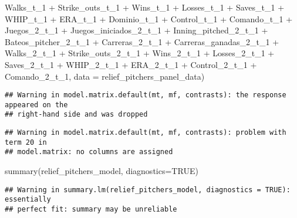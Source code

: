 \documentclass[
]{article}
\newenvironment{Shaded}{\begin{snugshade}}{\end{snugshade}}
\newcommand{\AttributeTok}[1]{\textcolor[rgb]{0.77,0.63,0.00}{#1}}
\newcommand{\ConstantTok}[1]{\textcolor[rgb]{0.00,0.00,0.00}{#1}}
\newcommand{\FunctionTok}[1]{\textcolor[rgb]{0.00,0.00,0.00}{#1}}
\newcommand{\NormalTok}[1]{#1}
\newcommand{\SpecialCharTok}[1]{\textcolor[rgb]{0.00,0.00,0.00}{#1}}
\begin{document}
\begin{Shaded}
\begin{Highlighting}[]
\NormalTok{Walks\_t\_1  }\SpecialCharTok{+}\NormalTok{ Strike\_outs\_t\_1 }\SpecialCharTok{+}\NormalTok{ Wins\_t\_1 }\SpecialCharTok{+}\NormalTok{  Losses\_t\_1 }\SpecialCharTok{+}\NormalTok{ Saves\_t\_1 }\SpecialCharTok{+}\NormalTok{ WHIP\_t\_1 }\SpecialCharTok{+}\NormalTok{ ERA\_t\_1 }\SpecialCharTok{+}\NormalTok{  Dominio\_t\_1 }\SpecialCharTok{+}\NormalTok{ Control\_t\_1 }\SpecialCharTok{+}         
\NormalTok{Comando\_t\_1 }\SpecialCharTok{+}\NormalTok{ Juegos\_2\_t\_1 }\SpecialCharTok{+}\NormalTok{ Juegos\_iniciados\_2\_t\_1 }\SpecialCharTok{+}\NormalTok{ Inning\_pitched\_2\_t\_1 }\SpecialCharTok{+}\NormalTok{ Bateos\_pitcher\_2\_t\_1 }\SpecialCharTok{+}\NormalTok{ Carreras\_2\_t\_1  }\SpecialCharTok{+} 
\NormalTok{Carreras\_ganadas\_2\_t\_1 }\SpecialCharTok{+}\NormalTok{ Walks\_2\_t\_1 }\SpecialCharTok{+}\NormalTok{ Strike\_outs\_2\_t\_1 }\SpecialCharTok{+}\NormalTok{ Wins\_2\_t\_1 }\SpecialCharTok{+}\NormalTok{ Losses\_2\_t\_1 }\SpecialCharTok{+}\NormalTok{ Saves\_2\_t\_1 }\SpecialCharTok{+}\NormalTok{ WHIP\_2\_t\_1 }\SpecialCharTok{+}
\NormalTok{ERA\_2\_t\_1 }\SpecialCharTok{+}\NormalTok{ Control\_2\_t\_1 }\SpecialCharTok{+}\NormalTok{ Comando\_2\_t\_1, }
\AttributeTok{data =}\NormalTok{ relief\_pitchers\_panel\_data)}
\end{Highlighting}
\end{Shaded}

\begin{verbatim}
## Warning in model.matrix.default(mt, mf, contrasts): the response appeared on the
## right-hand side and was dropped
\end{verbatim}

\begin{verbatim}
## Warning in model.matrix.default(mt, mf, contrasts): problem with term 20 in
## model.matrix: no columns are assigned
\end{verbatim}

\begin{Shaded}
\begin{Highlighting}[]
\FunctionTok{summary}\NormalTok{(relief\_pitchers\_model, }\AttributeTok{diagnostics=}\ConstantTok{TRUE}\NormalTok{)}
\end{Highlighting}
\end{Shaded}

\begin{verbatim}
## Warning in summary.lm(relief_pitchers_model, diagnostics = TRUE): essentially
## perfect fit: summary may be unreliable
\end{verbatim}
\end{document}
